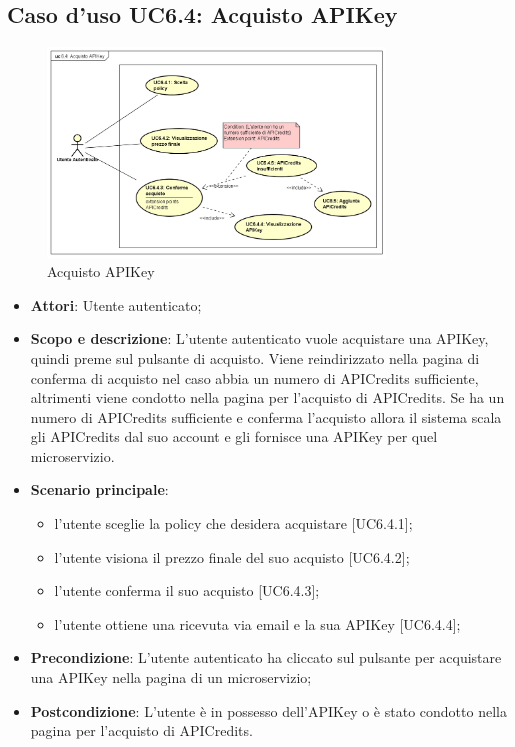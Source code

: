 \documentclass[12pt,a4paper,titlepage]{article}
\begin{document}
	\subsection{Caso d'uso UC6.4: Acquisto APIKey}
	\label{UC6.4}
	\begin{figure}[H]
		\centering
		\includegraphics[width=0.8\textwidth]{UseCase/AcquistoAPIKey}
		\caption{Acquisto APIKey}
	\end{figure}
	\begin{itemize}
		\item \textbf{Attori}: Utente autenticato;
		\item \textbf{Scopo e descrizione}: L'utente autenticato vuole acquistare una APIKey, quindi preme sul pulsante di acquisto. Viene reindirizzato nella pagina di conferma di acquisto nel caso abbia un numero di APICredits sufficiente, altrimenti viene condotto nella pagina per l'acquisto di APICredits. Se ha un numero di APICredits sufficiente e conferma l'acquisto allora il sistema scala gli APICredits dal suo account e gli fornisce una APIKey per quel microservizio.
		\item \textbf{Scenario principale}:
			\begin{itemize}
				\item l'utente sceglie la policy che desidera acquistare [UC6.4.1];
				\item l'utente visiona il prezzo finale del suo acquisto [UC6.4.2];
				\item l'utente conferma il suo acquisto [UC6.4.3];
				\item l'utente ottiene una ricevuta via email e la sua APIKey [UC6.4.4];
			\end{itemize}
		\item \textbf{Precondizione}: L'utente autenticato ha cliccato sul pulsante per acquistare una APIKey nella pagina di un microservizio;
		\item \textbf{Postcondizione}: L'utente è in possesso dell'APIKey o è stato condotto nella pagina per l'acquisto di APICredits.
	\end{itemize}
\end{document}
